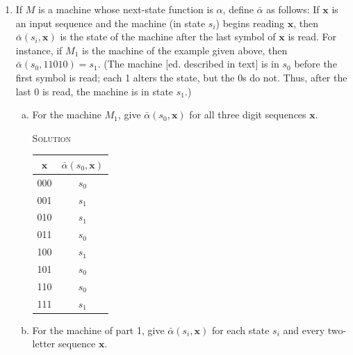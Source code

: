 \documentclass[twoside]{amsart}
\newcommand{\solution}{\textsc{Solution}\xspace}
\begin{document}
\begin{enumerate}[A.]
\begin{enumerate}[1]
      \item If $M$ is a machine whose next-state function is $\alpha$,
      define $\bar{\alpha}$ as follows: If $\textbf{x}$ is an input
      sequence and the machine (in state $s_i$) begins reading
      $\mathbf{x}$, then $\bar{\alpha}(s_i,\mathbf{x})$ is the state of
      the machine after the last symbol of $\mathbf{x}$ is read.
      For instance, if $M_1$ is the machine of the example given above, then 
      $\bar{\alpha}(s_0,11010)=s_1$. (The machine [ed. described in text]
      is in $s_0$ before the first symbol is read; each 1 alters the state,
      but the 0s do not. Thus, after the last 0 is read, the machine is
      in state $s_1$.)

      \begin{enumerate}[(a)]
         \item For the machine $M_1$, give $\bar{\alpha}(s_0,\mathbf{x})$
	 for all three digit sequences $\mathbf{x}$.

         \noindent \solution 
	 \begin{center}
	 \begin{tabular}{cc}
	    $\mathbf{x}$ & $\bar{\alpha}(s_0,\mathbf{x})$ \\ \hline
	             000 & $s_0$ \\
		     001 & $s_1$ \\
		     010 & $s_1$ \\
		     011 & $s_0$ \\
		     100 & $s_1$ \\
		     101 & $s_0$ \\
		     110 & $s_0$ \\
		     111 & $s_1$
	 \end{tabular}
	 \end{center}

	 \item For the machine of part 1, give $\bar{\alpha}(s_i,\mathbf{x})$
	 for each state $s_i$ and every two-letter sequence $\mathbf{x}$.


\end{enumerate}
\end{enumerate}
\end{enumerate}
\end{document}
